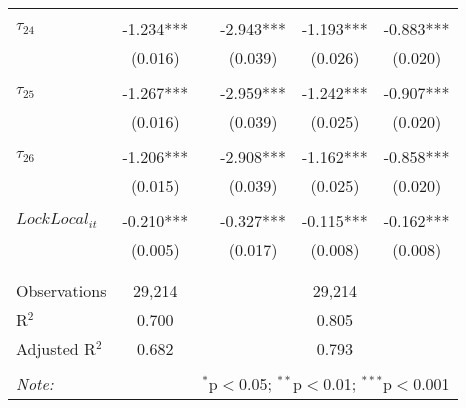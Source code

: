\begin{tabular}{@{\extracolsep{-5pt}}lccccc}
                &           &&           &           &           \\[-2.1ex]
$\tau_{24}$     & -1.234*** && -2.943*** & -1.193*** & -0.883*** \\
                &  (0.016)  &&  (0.039)  &  (0.026)  &  (0.020)  \\
                &           &&           &           &           \\[-2.1ex]
$\tau_{25}$     & -1.267*** && -2.959*** & -1.242*** & -0.907*** \\
                &  (0.016)  &&  (0.039)  &  (0.025)  &  (0.020)  \\
                &           &&           &           &           \\[-2.1ex]
$\tau_{26}$     & -1.206*** && -2.908*** & -1.162*** & -0.858*** \\
                &  (0.015)  &&  (0.039)  &  (0.025)  &  (0.020)  \\
                &           &&           &           &           \\[-1.ex]
$LockLocal_{it}$ & -0.210*** && -0.327*** & -0.115*** & -0.162*** \\
                 &  (0.005)  &&  (0.017)  &  (0.008)  &  (0.008)  \\
                 &           &&           &           &           \\[-2.1ex]
\hline \\[-1.8ex] 
Observations     & 29,214 && \multicolumn{3}{c}{29,214} \\ 
R$^{2}$          & 0.700  && \multicolumn{3}{c}{ 0.805} \\ 
Adjusted R$^{2}$ & 0.682  && \multicolumn{3}{c}{ 0.793} \\ 
\hline 
\hline \\[-1.8ex] 
\textit{Note:}  & \multicolumn{5}{r}{$^{*}$p$<$0.05; $^{**}$p$<$0.01; $^{***}$p$<$0.001} \\ 
\end{tabular} 
